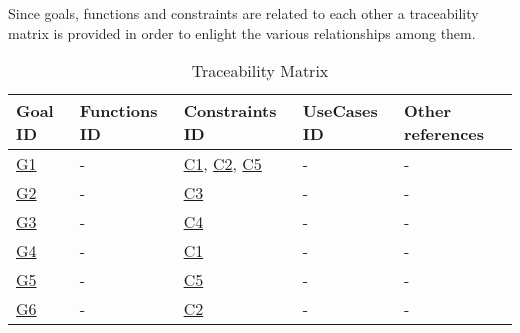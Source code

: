 Since goals, functions and constraints are related to each other a traceability matrix is provided in order to enlight the various relationships among them.
\begin{flushleft}

\begin{table}[htp]

\begin{tabular}{l|l|l|l|l|}
\hline
\hline
Goal ID&Functions ID&Constraints ID&UseCases ID&Other references\\
\hline
\hline
\hyperlink{G1}{G1}&-&\hyperlink{C1}{C1}, \hyperlink{C2}{C2}, \hyperlink{C5}{C5}&-&-\\
\hline
\hyperlink{G2}{G2}&-&\hyperlink{C3}{C3}&-&-\\
\hline
\hyperlink{G3}{G3}&-&\hyperlink{C4}{C4}&-&-\\
\hline
\hyperlink{G4}{G4}&-&\hyperlink{C1}{C1}&-&-\\
\hline
\hyperlink{G5}{G5}&-&\hyperlink{C5}{C5}&-&-\\
\hline
\hyperlink{G6}{G6}&-&\hyperlink{C2}{C2}&-&-\\
\hline

\end{tabular}

\caption{Traceability Matrix} 

\end{table}

\end{flushleft}
